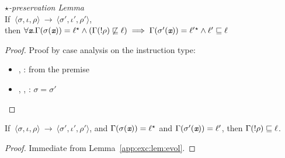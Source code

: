 \begin{myLemma}{\emph{$\star$-preservation Lemma}}\\
\label{app:exc:lem:evol}
If $~\langle \sigma, \iota, \rho \rangle~ \rightarrow
~\langle \sigma', \iota', \rho' \rangle$, \\
then $\forall
 \emph{\texttt{x}}. \Gamma(\sigma(\emph{\texttt{x}})) = \ell{}^\star \wedge
 (\Gamma(!\rho) 
 \not\sqsubseteq \ell) \implies \Gamma(\sigma'(\emph{\texttt{x}})) = 
  \ell' {}^\star   \wedge \ell' \sqsubseteq \ell$
\end{myLemma}
\begin{proof}
Proof by case analysis on the instruction type:
\begin{itemize}
\item {}, : from the premise
\item {}, , : $\sigma = \sigma'$
\end{itemize}
\end{proof}

\begin{mycor}
\label{app:exc:cor:cor1}
If $~\langle \sigma, \iota, \rho \rangle~ \rightarrow
~\langle \sigma', \iota', \rho' \rangle$, and
$\Gamma(\sigma(\emph{\texttt{x}})) = \ell{}^\star $ and
$\Gamma(\sigma'(\emph{\texttt{x}})) = \ell'$, then 
$\Gamma(!\rho) \sqsubseteq \ell$.
\end{mycor}
\begin{proof}
Immediate from Lemma~\ref{app:exc:lem:evol}.
\end{proof}


